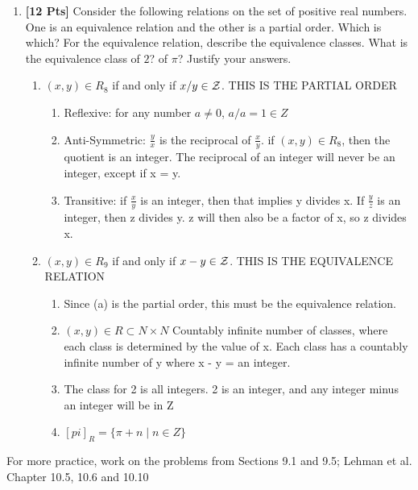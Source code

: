 \begin{enumerate}
        \item {\bf [12 Pts]} Consider the following relations on the set of positive real numbers. One is an equivalence relation and the other is a partial order. Which is which? For the equivalence relation, describe the equivalence classes. What is the equivalence class of $2$? of $\pi$? Justify your answers.

        \begin{enumerate}

            \item $(x,y) \in R_8$ if and only if $x/y \in \cal Z$. THIS IS THE PARTIAL ORDER
                \begin{enumerate}
                    \item Reflexive: for any number $a \neq 0$, $a/a = 1 \in Z$
                    \item Anti-Symmetric: $\frac{y}{x}$ is the reciprocal of $\frac{x}{y}$. if $(x,y) \in R_8$, then the quotient is an integer. The reciprocal of an integer will never be an integer, except if x = y.
                    \item Transitive: if $\frac{x}{y}$ is an integer, then that implies y divides x. If $\frac{y}{z}$ is an integer, then z divides y. z will then also be a factor of x, so z divides x.
                \end{enumerate}

            \item $(x,y) \in R_9$ if and only if $x-y \in \cal Z$. THIS IS THE EQUIVALENCE RELATION
                \begin{enumerate}
                    \item Since (a) is the partial order, this must be the equivalence relation.
                    \item $(x, y) \in R \subset N \times N$ Countably infinite number of classes, where each class is determined by the value of x. Each class has a countably infinite number of y where x - y = an integer.
                    \item The class for 2 is all integers. 2 is an integer, and any integer minus an integer will be in Z
                    \item $[pi]_R = \{ \pi + n \;|\; n \in Z \} $
                \end{enumerate}
        \end{enumerate}


    \end{enumerate}


\noindent
For more practice, work on the problems from Sections 9.1 and 9.5; Lehman et al. Chapter 10.5, 10.6 and 10.10

